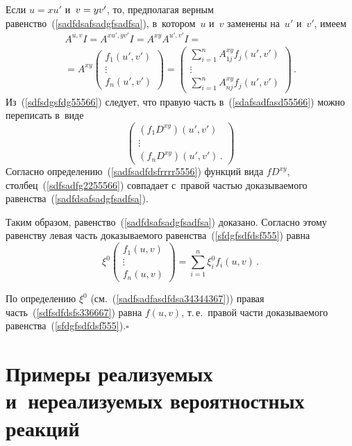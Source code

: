 \begin{multicols}{2}
Если $u=xu'$ и~$v\hm=yv'$, то, предполагая верным равенство~(\ref{sadfdsafsadgfsadfsa}),
в~котором~$u$ и~$v$ заменены на~$u'$ и~$v'$,
имеем
\begin{multline}
\label{sdafsadfasd55566}
A^{u,v}I = A^{xu',yv'}I = A^{xy}A^{u',v'}I ={}\\
{}=A^{xy}
\begin{pmatrix}
 f_1(u',v')\\
 \vdots\\
 f_n(u',v')
\end{pmatrix}=
\begin{pmatrix}
 \sum\limits_{i=1}^n A^{xy}_{1j}f_j(u',v')\\
 \vdots\\
\sum\limits_{i=1}^n A^{xy}_{nj}f_j(u',v')
\end{pmatrix}\,.
\end{multline}
Из~(\ref{sdfsdgsfdg55566}) следует, что правую часть
в~(\ref{sdafsadfasd55566}) можно переписать в~виде
\begin{equation}
\label{sdfsadfg2255566}
\begin{pmatrix}
 \left(f_1D^{xy}\right)(u',v')\\
\vdots\\
(f_nD^{xy})(u',v')\,.
\end{pmatrix}
\end{equation}
Согласно определению~(\ref{sadfsadfdsfrrrr5556})
функций вида $fD^{xy}$, столбец~(\ref{sdfsadfg2255566})
совпадает с~правой частью
доказыва\-емо\-го равенства~(\ref{sadfdsafsadgfsadfsa}).

Таким образом, равенство~(\ref{sadfdsafsadgfsadfsa}) доказано.
Согласно этому равенству
левая часть доказываемого равенства~(\ref{sfdgfsdfdsf555}) равна
\begin{equation}
\label{sdfsdfdsfs336667}
\xi^0 \begin{pmatrix}
 f_1(u,v)\\
 \vdots\\
 f_n(u,v)\end{pmatrix}
= \sum\limits_{i=1}^n\xi^0_if_i(u,v)\,.
\end{equation}

По определению $\xi^0$ (см.~(\ref{sadfsadfasdfdsa34344367})) правая
часть~(\ref{sdfsdfdsfs336667}) равна $f(u,v)$, т.\,е.\  правой части
доказываемого равенства~(\ref{sfdgfsdfdsf555}).\hfill$\square$

\section{Примеры реализуемых и~нереализуемых вероятностных реакций}


\end{multicols}

